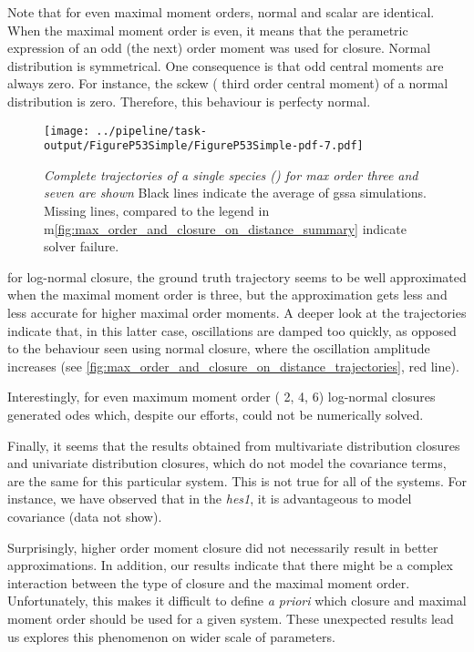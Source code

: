 Note that for even maximal moment orders, normal and scalar are identical.
When the maximal moment order is even, it means that the perametric expression of an odd (the next) order moment was used for closure.
Normal distribution is symmetrical. One consequence is that odd central moments are always zero. 
For instance, the sckew (\ie{} third order central moment) of a normal distribution is zero.
Therefore, this behaviour is perfecty normal.


\begin{figure}
    \centering
    \texttt{[image: ../pipeline/task-output/FigureP53Simple/FigureP53Simple-pdf-7.pdf]}
    \caption{\emph{Complete trajectories of a single species (\pft) for max order three and seven are shown} Black lines indicate the average of \gls{gssa} simulations. Missing lines, compared to the legend in  m\autoref{fig:max_order_and_closure_on_distance_summary} indicate solver failure.}
    \label{fig:max_order_and_closure_on_distance_trajectories}
\end{figure}

 
for log-normal closure, the ground truth trajectory seems to be well approximated when the maximal moment order is three, but the approximation gets less and less accurate for higher maximal order moments.
A deeper look at the trajectories indicate that, in this latter case,
oscillations are damped too quickly, as opposed to the behaviour seen using normal closure, where the oscillation amplitude increases (see \autoref{fig:max_order_and_closure_on_distance_trajectories}, red line).

Interestingly, for even maximum moment order (\ie{} 2, 4, 6) log-normal closures generated \gls{ode}s which, despite our efforts, could not be numerically solved.

Finally, it seems that the results obtained from multivariate distribution closures and  univariate distribution closures, which do not model the covariance terms, are the same for this particular system. 
This is not true for all of the systems. 
For instance, we have observed that in the \emph{hes1}, it is advantageous to model covariance (data not show).

Surprisingly, higher order moment closure did not necessarily result in better approximations.
In addition, our results indicate that there might be a complex interaction between the type of closure and the maximal moment order. 
Unfortunately, this makes it difficult to define \emph{a priori} which closure and maximal moment order should be used for a given system.
These unexpected results lead us explores this phenomenon on wider scale of parameters.

